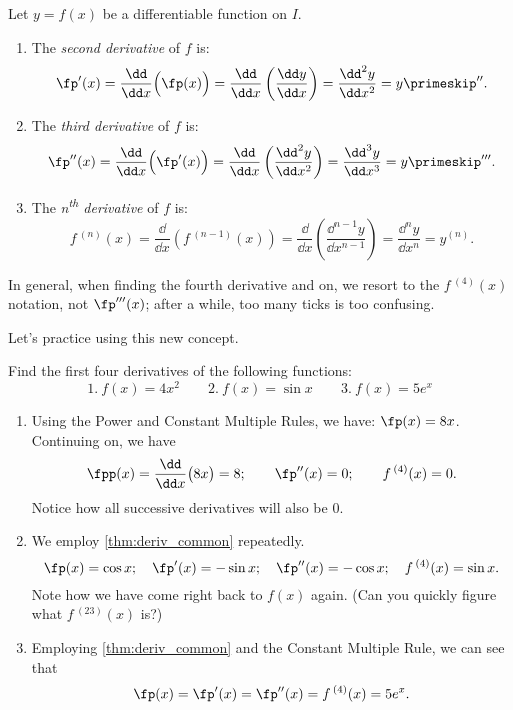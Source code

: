\begin{definition}\label{def:Higher_Deriv}%
Let $y=f(x)$ be a differentiable function on $I$. 
	\begin{enumerate}
		\item	The \emph{second derivative} of $f$ is: 
			\[ \fp'(x) = \frac{\dd}{\dd x}\Bigl(\fp(x)\Bigr) = \frac{\dd}{\dd x}\left(\frac{\dd y}{\dd x}\right) = \frac{\dd^2y}{\dd x^2}=y\primeskip''.\]
		\item	The \emph{third derivative} of $f$ is: 
			\[ \fp''(x) = \frac{\dd}{\dd x}\Bigl(\fp'(x)\Bigr) = \frac{\dd}{\dd x}\left(\frac{\dd^2y}{\dd x^2}\right) = \frac{\dd^3y}{\dd x^3}=y\primeskip'''.\]
		\item	The \emph{n\textsuperscript{th} derivative} of $f$ is:
			\[ f\,^{(n)}(x) = \frac{\dd}{\dd x}\left(f\,^{(n-1)}(x)\right) = \frac{\dd}{\dd x}\left(\frac{\dd^{n-1}y}{\dd x^{n-1}}\right) = \frac{\dd^ny}{\dd x^n}=y^{(n)}.\]
	\end{enumerate}
\end{definition}


In general, when finding the fourth derivative and on, we resort to the $f\,^{(4)}(x)$ notation, not $\fp'''(x)$; after a while, too many ticks is too confusing.\bigskip

Let's practice using this new concept.

\begin{example}\label{ex_high_order}%
Find the first four derivatives of the following functions:
\[1.\ f(x) = 4x^2\qquad 2.\ f(x) = \sin x\qquad 3.\ f(x) = 5e^x\]
\solution
\begin{enumerate}
	\item	Using the Power and Constant Multiple Rules, we have: $\fp(x) = 8x$. Continuing on, we have 
	\[\fpp(x) = \frac{\dd}{\dd x}\bigl(8x\bigr) = 8;\qquad \fp''(x) = 0;\qquad f\,^{(4)}(x) = 0.\]
Notice how all successive derivatives will also be 0.
	\item	We employ \autoref{thm:deriv_common} repeatedly.
	\[\fp(x) = \cos x;\quad \fp'(x) = -\sin x;\quad \fp''(x) = -\cos x;\quad f\,^{(4)}(x) = \sin x.\]
	Note how we have come right back to $f(x)$ again. (Can you quickly figure what $f\,^{(23)}(x)$ is?)
	\item	Employing \autoref{thm:deriv_common} and the Constant Multiple Rule, we can see that
	\[\fp(x) = \fp'(x) = \fp''(x) = f\,^{(4)}(x) = 5e^x.\]
	\end{enumerate}
\end{example}

